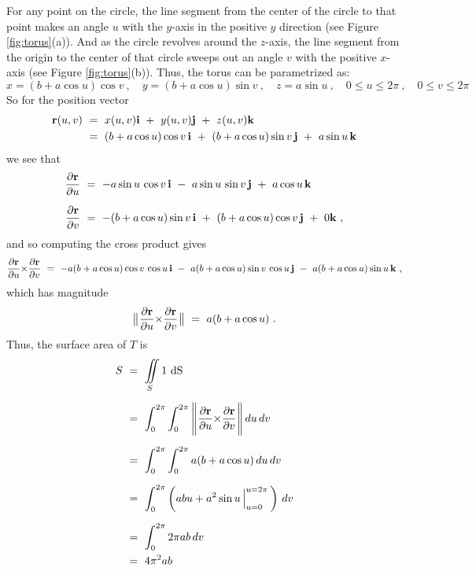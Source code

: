 \begin{solu}

For any point on the circle, the line segment from the center of the circle to that point makes an angle $u$ with the
$y$-axis in the positive $y$ direction (see Figure \ref{fig:torus}(a)). And as the circle revolves around the $z$-axis,
the line segment from the origin to the center of that circle sweeps out an angle $v$ with the positive $x$-axis (see
Figure \ref{fig:torus}(b)). Thus, the torus can be parametrized as:
\begin{displaymath}
 x = (b+a\cos u)\cos v ~,\quad y = (b+a\cos u)\sin v ~,\quad z = a\sin u~,\quad 0\le u\le 2\pi~,\quad 0\le v\le 2\pi
\end{displaymath}
So for the position vector
\begin{align*}
 \mathbf{ r}(u,v) ~&=~ x(u,v) \mathbf{ i} ~+~ y(u,v) \mathbf{ j} ~+~ z(u,v) \mathbf{ k}\\
 &=~ (b+a\cos u)\cos v \,\mathbf{ i} ~+~ (b+a\cos u)\sin v \,\mathbf{ j} ~+~ a\sin u \,\mathbf{ k}
\end{align*}
we see that
\begin{align*}
 \dfrac{\partial \mathbf{ r}}{\partial u} ~&=~
  -a\sin u\,\cos v \,\mathbf{ i} ~-~ a\sin u\,\sin v \,\mathbf{ j} ~+~ a\cos u \,\mathbf{ k}\\[6pt]
 \dfrac{\partial \mathbf{ r}}{\partial v} ~&=~
  -(b+a\cos u)\sin v \,\mathbf{ i} ~+~ (b+a\cos u)\cos v \,\mathbf{ j} ~+~ 0 \mathbf{ k} ~,
\end{align*}
and so computing the cross product gives
\begin{displaymath}
 \dfrac{\partial \mathbf{ r}}{\partial u} \mathbf{\times} \dfrac{\partial \mathbf{ r}}{\partial v} ~=~
  -a(b+a\cos u)\cos v\,\cos u \,\mathbf{ i} ~-~ a(b+a\cos u)\sin v\,\cos u\,\mathbf{ j} ~-~ a(b+a\cos u)\sin u \,\mathbf{ k} ~,
\end{displaymath}
which has magnitude
\begin{displaymath}
\bigl\lVert\mspace{1mu}\dfrac{\partial \mathbf{ r}}{\partial u} \mathbf{\times} \dfrac{\partial \mathbf{ r}}{\partial v}\mspace{1mu}\bigr\rVert ~=~ a(b+a\cos u) ~.
\end{displaymath}
Thus, the surface area of $T$ is
\begin{align*}
 S ~&=~ \diint\limits_{\superficie} 1\,\d \S\\[6pt]
  &=~ \dint_0^{2\pi} \dint_0^{2\pi}\,\NORM{\Crossprod{\dfrac{\partial \vector{r}}{\partial u}}{\dfrac{\partial
  \vector{r}}{\partial v}}}\,du\,dv\\[6pt]
  &=~ \dint_0^{2\pi} \dint_0^{2\pi} a(b+a\cos u)\,du\,dv\\[6pt]
  &=~ \dint_0^{2\pi} \left( abu + a^2 \sin u \,\Big|_{u=0}^{u=2\pi}\,\right)\,dv\\[6pt]
  &=~ \dint_0^{2\pi} 2\pi ab\,dv\\
  &=~ 4\pi^2 ab
\end{align*}
\end{solu}


